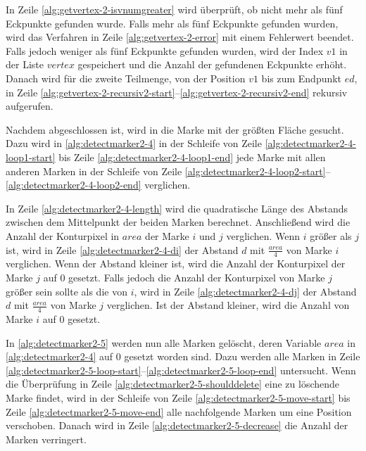 In Zeile \ref{alg:getvertex-2-isvnumgreater} wird überprüft, ob nicht mehr als fünf Eckpunkte gefunden wurde. Falls
 mehr als fünf Eckpunkte gefunden wurden, wird das Verfahren in Zeile \ref{alg:getvertex-2-error} mit einem Fehlerwert
 beendet. Falls jedoch weniger als fünf Eckpunkte gefunden wurden, wird der Index $\mathit{v1}$ in der Liste
 $\mathit{vertex}$ gespeichert und die Anzahl der gefundenen Eckpunkte erhöht. Danach wird  für die
 zweite Teilmenge, von der Position $\mathit{v1}$ bis zum Endpunkt $\mathit{ed}$, in Zeile
 \ref{alg:getvertex-2-recursiv2-start}--\ref{alg:getvertex-2-recursiv2-end} rekursiv aufgerufen.

Nachdem  abgeschlossen ist, wird in  die Marke mit der größten Fläche
 gesucht. Dazu wird in \autoref{alg:detectmarker2-4} in der Schleife von Zeile \ref{alg:detectmarker2-4-loop1-start}
 bis Zeile \ref{alg:detectmarker2-4-loop1-end} jede Marke mit allen anderen Marken in der Schleife von Zeile
 \ref{alg:detectmarker2-4-loop2-start}--\ref{alg:detectmarker2-4-loop2-end} verglichen.



In Zeile \ref{alg:detectmarker2-4-length} wird die quadratische Länge des Abstands zwischen dem Mittelpunkt der beiden
 Marken berechnet. Anschließend wird die Anzahl der Konturpixel in $\mathit{area}$ der Marke $i$ und $j$ verglichen.
 Wenn $i$ größer als $j$ ist, wird in Zeile \ref{alg:detectmarker2-4-di} der Abstand $d$ mit $\frac{\mathit{area}}{4}$
 von Marke $i$ verglichen. Wenn der Abstand kleiner ist, wird die Anzahl der Konturpixel der Marke $j$ auf $0$ gesetzt.
 Falls jedoch die Anzahl der Konturpixel von Marke $j$ größer sein sollte als die von $i$, wird in Zeile
 \ref{alg:detectmarker2-4-dj} der Abstand $d$ mit $\frac{\mathit{area}}{4}$ von Marke $j$ verglichen. Ist der Abstand
 kleiner, wird die Anzahl von Marke $i$ auf $0$ gesetzt.

In \autoref{alg:detectmarker2-5} werden nun alle Marken gelöscht, deren Variable $\mathit{area}$ in
 \autoref{alg:detectmarker2-4} auf $0$ gesetzt worden sind. Dazu werden alle Marken in Zeile
 \ref{alg:detectmarker2-5-loop-start}--\ref{alg:detectmarker2-5-loop-end} untersucht. Wenn die Überprüfung in Zeile
 \ref{alg:detectmarker2-5-shoulddelete} eine zu löschende Marke findet, wird in der Schleife von Zeile
 \ref{alg:detectmarker2-5-move-start} bis Zeile \ref{alg:detectmarker2-5-move-end} alle nachfolgende Marken um eine
 Position verschoben. Danach wird in Zeile \ref{alg:detectmarker2-5-decrease} die Anzahl der Marken verringert.


